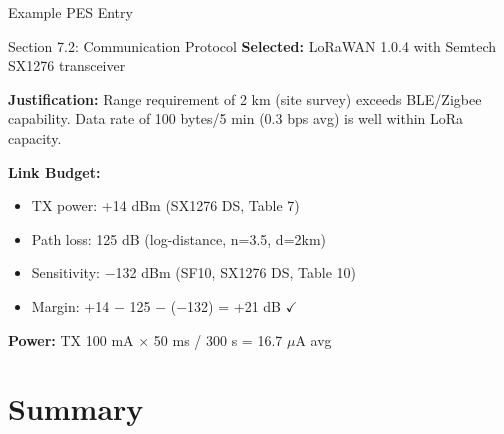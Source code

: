 \documentclass[aspectratio=169,11pt]{beamer}
\begin{document}
\begin{frame}{Example PES Entry}
    \begin{exampleblock}{Section 7.2: Communication Protocol}
        \textbf{Selected:} LoRaWAN 1.0.4 with Semtech SX1276 transceiver
        
        \textbf{Justification:} Range requirement of 2 km (site survey) exceeds BLE/Zigbee capability. Data rate of 100 bytes/5 min (0.3 bps avg) is well within LoRa capacity.
        
        \textbf{Link Budget:}
        \begin{itemize}
            \item TX power: +14 dBm (SX1276 DS, Table 7)
            \item Path loss: 125 dB (log-distance, n=3.5, d=2km)
            \item Sensitivity: $-$132 dBm (SF10, SX1276 DS, Table 10)
            \item Margin: +14 $-$ 125 $-$ ($-$132) = +21 dB $\checkmark$
        \end{itemize}
        
        \textbf{Power:} TX 100 mA $\times$ 50 ms / 300 s = 16.7 $\mu$A avg
    \end{exampleblock}
\end{frame}

\section{Summary}
\end{document}
